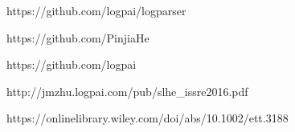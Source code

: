 https://github.com/logpai/logparser

https://github.com/PinjiaHe

https://github.com/logpai

http://jmzhu.logpai.com/pub/slhe_issre2016.pdf

https://onlinelibrary.wiley.com/doi/abs/10.1002/ett.3188